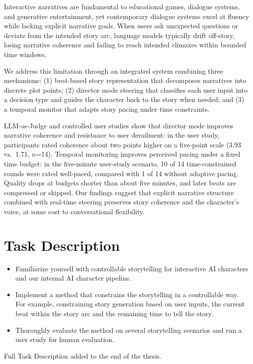 
Interactive narratives are fundamental to educational games, dialogue systems, and generative entertainment, yet contemporary dialogue systems excel at fluency while lacking explicit narrative goals. When users ask unexpected questions or deviate from the intended story arc, language models typically drift off-story, losing narrative coherence and failing to reach intended climaxes within bounded time windows.

We address this limitation through an integrated system combining three mechanisms: (1) beat-based story representation that decomposes narratives into discrete plot points; (2) director mode steering that classifies each user input into a decision type and guides the character back to the story when needed; and (3) a temporal monitor that adapts story pacing under time constraints.

LLM-as-Judge and controlled user studies show that director mode improves narrative coherence and resistance to user derailment: in the user study, participants rated coherence about two points higher on a five-point scale (3.93 vs.\ 1.71, $n$=14). Temporal monitoring improves perceived pacing under a fixed time budget: in the five-minute user-study scenario, 10 of 14 time-constrained rounds were rated well-paced, compared with 1 of 14 without adaptive pacing. Quality drops at budgets shorter than about five minutes, and later beats are compressed or skipped. Our findings suggest that explicit narrative structure combined with real-time steering preserves story coherence and the character's voice, at some cost to conversational flexibility.



\clearpage
{\chapter*{Task Description}}
\begin{itemize}
\item Familiarize yourself with controllable storytelling for interactive AI characters and our internal AI 
character pipeline. 
\item  Implement a method that constrains the storytelling in a controllable way. For example, constraining 
story generation based on user inputs, the current beat within the story arc and the remaining time to tell the story. 
\item  Thoroughly evaluate the method on several storytelling scenarios and run a user study for human 
evaluation.
\end{itemize}

Full Task Description added to the end of the thesis.